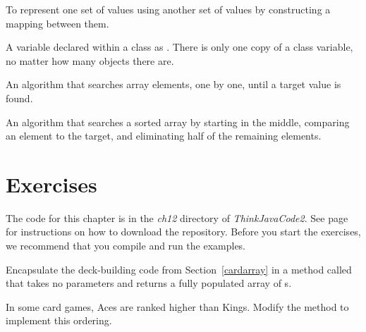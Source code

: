 \begin{description}

To represent one set of values using another set of values by constructing a mapping between them.

A variable declared within a class as .
There is only one copy of a class variable, no matter how many objects there are.

An algorithm that searches array elements, one by one, until a target value is found.

An algorithm that searches a sorted array by starting in the middle, comparing an element to the target, and eliminating half of the remaining elements.

\end{description}


\section{Exercises}

The code for this chapter is in the {\it ch12} directory of {\it ThinkJavaCode2}.
See page~\pageref{code} for instructions on how to download the repository.
Before you start the exercises, we recommend that you compile and run the examples.



\begin{exercise}  %

Encapsulate the deck-building code from Section~\ref{cardarray} in a method called  that takes no parameters and returns a fully populated array of s.

\end{exercise}


\begin{exercise}  %

In some card games, Aces are ranked higher than Kings.
Modify the  method to implement this ordering.

\end{exercise}


